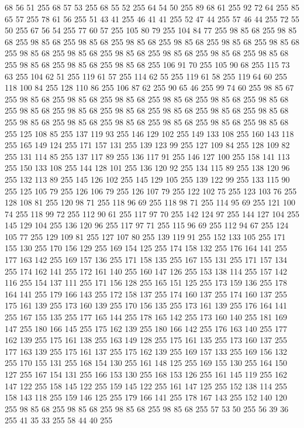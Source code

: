 68 56 51 255 68 57 53 255 68 55 52 255 64 54 50 255 89 68 61 255 92 72 64 255 85 65 57 255 78 61 56 255 51 43 41 255 46 41 41 255 52 47 44 255 57 46 44 255 72 55 50 255 67 56 54 255 77 60 57 255 105 80 79 255 104 84 77 255 98 85 68 255 98 85 68 255 98 85 68 255 98 85 68 255 98 85 68 255 98 85 68 255 98 85 68 255 98 85 68 255 98 85 68 255 98 85 68 255 98 85 68 255 98 85 68 255 98 85 68 255 98 85 68 255 98 85 68 255 98 85 68 255 98 85 68 255 106 91 70 255 105 90 68 255 115 73 63 255 104 62 51 255 119 61 57 255 114 62 55 255 119 61 58 255 119 64 60 255 118 100 84 255 128 110 86 255 106 87 62 255 90 65 46 255 99 74 60 255 98 85 67 255 98 85 68 255 98 85 68 255 98 85 68 255 98 85 68 255 98 85 68 255 98 85 68 255 98 85 68 255 98 85 68 255 98 85 68 255 98 85 68 255 98 85 68 255 98 85 68 255 98 85 68 255 98 85 68 255 98 85 68 255 98 85 68 255
98 85 68 255 98 85 68 255 125 108 85 255 137 119 93 255 146 129 102 255 149 133 108 255 160 143 118 255 165 149 124 255 171 157 131 255 139 123 99 255 127 109 84 255 128 109 82 255 131 114 85 255 137 117 89 255 136 117 91 255 146 127 100 255 158 141 113 255 150 133 108 255 144 128 101 255 136 120 92 255 134 115 89 255 138 120 96 255 132 113 89 255 145 126 102 255 145 129 105 255 139 122 99 255 133 115 90 255 125 105 79 255 126 106 79 255 126 107 79 255 122 102 75 255 123 103 76 255 128 108 81 255 120 98 71 255 118 96 69 255 118 98 71 255 114 95 69 255 121 100 74 255 118 99 72 255 112 90 61 255 117 97 70 255 142 124 97 255 144 127 104 255 145 129 104 255 136 120 96 255 117 97 71 255 115 96 69 255 112 94 67 255 124 105 77 255 129 109 81 255 127 107 80 255 139 119 91 255 152 133 105 255 171 155 130 255 170 156 129 255 169 154 125 255 174 158 132 255 176 164 141 255 177 163 142 255 169 157 136 255 171 158 135 255 167 155 131 255 171 157 134 255 174 162 141 255
172 161 140 255 160 147 126 255 153 138 114 255 157 142 116 255 154 137 111 255 171 156 128 255 165 151 125 255 173 159 136 255 178 164 141 255 179 166 143 255 172 158 137 255 174 160 137 255 174 160 137 255 175 161 139 255 173 160 139 255 170 156 135 255 173 161 139 255 176 164 141 255 167 155 135 255 177 165 144 255 178 165 142 255 173 160 140 255 181 169 147 255 180 166 145 255 175 162 139 255 180 166 142 255 176 163 140 255 177 162 139 255 175 161 138 255 163 149 128 255 175 161 135 255 173 160 137 255 177 163 139 255 175 161 137 255 175 162 139 255 169 157 133 255 169 156 132 255 170 155 131 255 168 154 130 255 161 148 125 255 169 155 130 255 164 150 127 255 167 154 131 255 166 153 130 255 168 153 126 255 161 145 119 255 162 147 122 255 158 145 122 255 159 145 122 255 161 147 125 255 152 138 114 255 158 143 118 255 159 146 125 255 179 166 141 255 178 167 143 255 152 140 120 255 98 85 68 255 98 85 68 255 98 85 68 255 98 85 68 255 57 53 50 255 56 39 36 255 41 35 33 255 58 44 40 255
